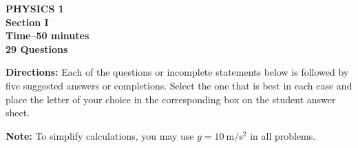 \documentclass[11pt]{article}
\begin{document}
\begin{center}
  \textbf{PHYSICS 1\\
    Section I\\
    Time--50 minutes\\%
    29 Questions %
  }
\end{center}

\textbf{Directions:} Each of the questions or incomplete statements below is
followed by five suggested answers or completions. Select the one that is best
in each case and place the letter of your choice in the corresponding box on
the student answer sheet.

\vspace{10pt}\textbf{Note:} To simplify calculations, you may use
$g=\SI{10}{\metre\per\second\squared}$ in all problems.
\end{document}
